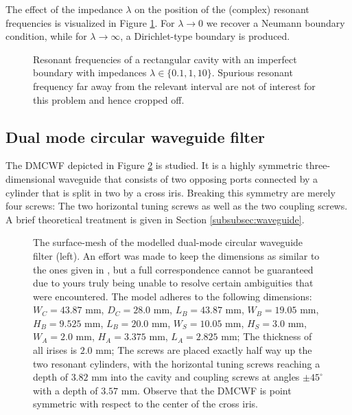 \documentclass[11pt, a4paper]{article}
\begin{document}
The effect of the impedance $\lambda$ on the position of the (complex) resonant
frequencies is visualized in Figure \ref{fig:imperfect-conductor-eigfreqs}.
For $\lambda \to 0$ we recover a Neumann boundary condition, while for 
$\lambda \to \infty$, a Dirichlet-type boundary is produced.
\begin{figure}[ht]
    \centering
    
    \caption{Resonant frequencies of a rectangular cavity with an imperfect boundary
    with impedances $\lambda \in \{0.1, 1, 10\}$. Spurious resonant frequency far
    away from the relevant interval are not of interest for this problem and hence
    cropped off.}
    \label{fig:imperfect-conductor-eigfreqs}
\end{figure}

\subsection{Dual mode circular waveguide filter}
\label{subsec:examples-dmcwf}

The \acrfull{DMCWF} depicted in Figure \ref{fig:DMCWF} is studied. It is a
highly symmetric three-dimensional waveguide that consists of two opposing
ports connected by a cylinder that is split in two by a cross iris. 
Breaking this symmetry are merely four screws: The two horizontal tuning
screws as well as the two coupling screws. A brief theoretical treatment is given
in Section \ref{subsubsec:waveguide}.

\begin{figure}[h]
    \centering
    
    \caption{The surface-mesh of the modelled dual-mode circular waveguide filter
    (left). An effort was made to keep the dimensions as similar to the ones
    given in \cite{DMCWF-Dimensions}, but a full correspondence cannot be guaranteed
    due to yours truly being unable to resolve certain ambiguities that were encountered.
    The model adheres to the following dimensions:
    $W_C=43.87$ mm, $D_C=28.0$ mm, $L_B=43.87$ mm, $W_B=19.05$ mm, $H_B=9.525$ mm,
    $L_B=20.0$ mm, $W_S=10.05$ mm, $H_S=3.0$ mm, $W_A=2.0$ mm, $H_A=3.375$ mm,
    $L_A=2.825$ mm; The thickness of all irises is $2.0$ mm; The screws
    are placed exactly half way up the two resonant cylinders,
    with the horizontal tuning screws reaching a depth of $3.82$ mm into the cavity
    and coupling screws at angles $\pm 45^{\circ}$ with a depth of $3.57$ mm.
    Observe that the \acrshort{DMCWF} is point symmetric with respect to the center 
    of the cross iris.}
    \label{fig:DMCWF}
\end{figure}
\end{document}
